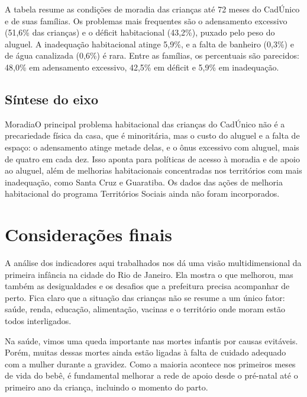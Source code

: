 A tabela resume as condições de moradia das crianças até 72 meses do CadÚnico e de suas famílias. Os problemas mais frequentes são o adensamento excessivo (51,6\% das crianças) e o déficit habitacional (43,2\%), puxado pelo peso do aluguel. A inadequação habitacional atinge 5,9\%, e a falta de banheiro (0,3\%) e de água canalizada (0,6\%) é rara. Entre as famílias, os percentuais são parecidos: 48,0\% em adensamento excessivo, 42,5\% em déficit e 5,9\% em inadequação.


\section{Síntese do eixo}

\begin{sintese}{Moradia}O principal problema habitacional das crianças do CadÚnico não é a precariedade física da casa, que é minoritária, mas o custo do aluguel e a falta de espaço: o adensamento atinge metade delas, e o ônus excessivo com aluguel, mais de quatro em cada dez. Isso aponta para políticas de acesso à moradia e de apoio ao aluguel, além de melhorias habitacionais concentradas nos territórios com mais inadequação, como Santa Cruz e Guaratiba. Os dados das ações de melhoria habitacional do programa Territórios Sociais ainda não foram incorporados.\end{sintese}

\chapter{Considerações finais}\label{cap:consideracoes}

A análise dos indicadores aqui trabalhados nos dá uma visão multidimensional da primeira infância na cidade do Rio de Janeiro. Ela mostra o que melhorou, mas também as desigualdades e os desafios que a prefeitura precisa acompanhar de perto. Fica claro que a situação das crianças não se resume a um único fator: saúde, renda, educação, alimentação, vacinas e o território onde moram estão todos interligados.

Na saúde, vimos uma queda importante nas mortes infantis por causas evitáveis. Porém, muitas dessas mortes ainda estão ligadas à falta de cuidado adequado com a mulher durante a gravidez. Como a maioria acontece nos primeiros meses de vida do bebê, é fundamental melhorar a rede de apoio desde o pré-natal até o primeiro ano da criança, incluindo o momento do parto.

